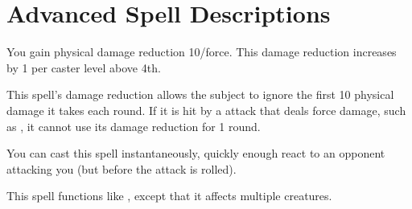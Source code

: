 \section{Advanced Spell Descriptions}

\begin{comment}
\subsubsection{A}
\end{comment}

\begin{spelleffect}
  You gain physical damage reduction 10/force. This damage reduction increases by 1 per caster level above 4th.
\end{spelleffect}
\begin{spellnotes}
  This spell's damage reduction allows the subject to ignore the first 10 physical damage it takes each round. If it is hit by a attack that deals force damage, such as , it cannot use its damage reduction for 1 round.

  You can cast this spell instantaneously, quickly enough react to an opponent attacking you (but before the attack is rolled).
\end{spellnotes}

\begin{spelleffect}
  This spell functions like , except that it affects multiple creatures.
\end{spelleffect}


